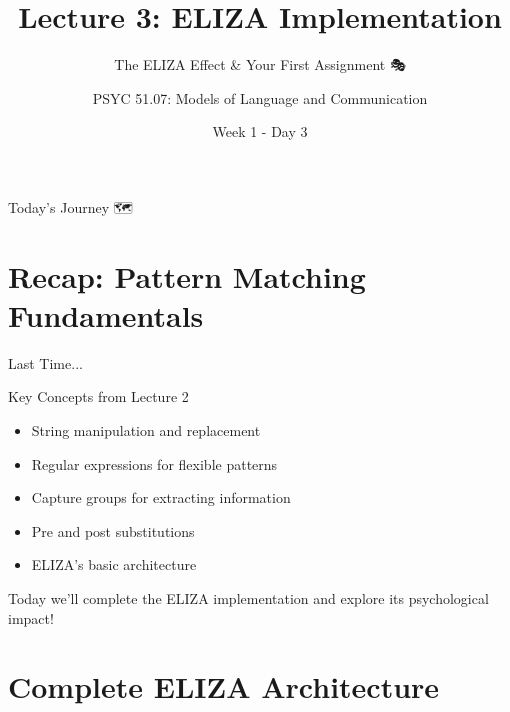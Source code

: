 \documentclass[aspectratio=169]{beamer}
\title{Lecture 3: ELIZA Implementation}
\subtitle{The ELIZA Effect \& Your First Assignment 🎭}
\author{PSYC 51.07: Models of Language and Communication}
\institute{Dr. Jeremy R. Manning}
\date{Week 1 - Day 3}
\begin{document}
\begin{frame}[shrink=10]
\titlepage
\end{frame}

\begin{frame}[shrink=5]{Today's Journey 🗺️}
\tableofcontents
\end{frame}

\section{Recap: Pattern Matching Fundamentals}

\begin{frame}{Last Time... 🔄}
\small
\begin{block}{Key Concepts from Lecture 2}
\begin{itemize}\setlength{\itemsep}{0pt}
    \item String manipulation and replacement
    \item Regular expressions for flexible patterns
    \item Capture groups for extracting information
    \item Pre and post substitutions
    \item ELIZA's basic architecture
\end{itemize}
\end{block}

\vspace{0.3cm}

\begin{discussion}
Today we'll complete the ELIZA implementation and explore its psychological impact!
\end{discussion}
\end{frame}

\section{Complete ELIZA Architecture}
\end{document}
